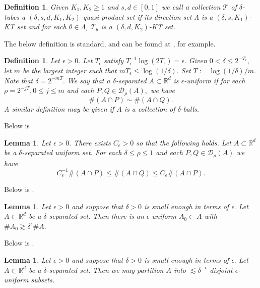 \documentclass[12pt]{amsart}
\newtheorem{defn}[theorem]{Definition}
\newtheorem{definition}[theorem]{Definition}
\newtheorem{lemma}[theorem]{Lemma}
\newcommand{\demm}{\de^{-\e}}
\newcommand{\R}{\mathbb{R}}\newcommand{\C}{\mathbb{C}}
\newcommand{\cT}{\mathcal{T}}
\newcommand{\cD}{\mathcal{D}}
\newcommand{\1}{\mathbf{1}}
\newcommand{\de}{\delta}
\newcommand{\e}{\epsilon}
\begin{document}
\begin{defn}\label{KK}
		Given $K_1,K_2\ge 1$ and $s,d\in[0,1]$ we call a  collection $\cT$ of $\delta$-tubes a $(\delta,s,d,K_1,K_2)$-quasi-product set if its direction set $\Lambda$ is a $(\delta,s,K_1)$-KT set and for each $\theta\in\Lambda$, $\cT_\theta$ is a $(\delta,d,K_2)$-KT set.
        \end{defn}

The below definition is standard, and can be found at \cite[Definition 2.3]{demwangszem}, for example.
	\begin{definition}\label{def.uniform}
		Let $\epsilon >0.$ Let $T_\epsilon$ satisfy $T_\epsilon^{-1}\log (2T_\epsilon) = \epsilon.$ Given $0 < \delta \leq 2^{-T_\epsilon},$ let $m$ be the largest integer such that $mT_\epsilon \leq \log (1/\delta).$ Set $T := \log(1/\delta)/m.$ Note that $\delta = 2^{-mT}.$ We say that a $\delta$-separated $A \subset \R^d$ is \textit{$\e$-uniform} if for each $\rho = 2^{-jT}, 0 \leq j \leq m$ and each $P,Q \in \cD_\rho(A),$ we have
		\begin{equation}
			\#(A \cap P) \sim \#(A \cap Q).
		\end{equation}
		A similar definition may be given if $A$ is a collection of $\delta$-balls.
	\end{definition}
	Below is \cite[Lemma 2.4]{demwangszem}.
	\begin{lemma}
		Let $\epsilon > 0.$ There exists $C_\e >0 $ so that the following holds. Let $A \subset \R^d$ be a $\delta$-separated uniform set. For each $\delta \leq \rho \leq 1$ and each $P,Q \in \cD_\rho(A)$ we have 
		\begin{equation}
			C_\epsilon^{-1}\#(A \cap P) \leq \#(A \cap Q) \leq C_\e \#(A \cap P).
		\end{equation}
	\end{lemma}
	Below is \cite[Lemma 2.15]{orpshabc}.
	\begin{lemma}\label{lem.unifsubset}
		Let $\epsilon > 0$ and suppose that $\delta >0 $ is small enough in terms of $\e.$ Let $A \subset \R^d$ be a $\delta$-separated set. Then there is an $\e$-uniform $A_0 \subset A$ with $\#A_0 \gtrsim \delta^{\epsilon}\#A.$ 
	\end{lemma}
Below is \cite[Lemma 2.9]{demwangszem}.
    \begin{lemma}\label{lem.partition}
    Let $\epsilon > 0$ and suppose that $\delta >0 $ is small enough in terms of $\e.$ Let $A \subset \R^d$ be a $\delta$-separated set. Then we may partition $A$ into $\lesssim \demm$ disjoint $\e$-uniform subsets. 
    \end{lemma}
\end{document}
